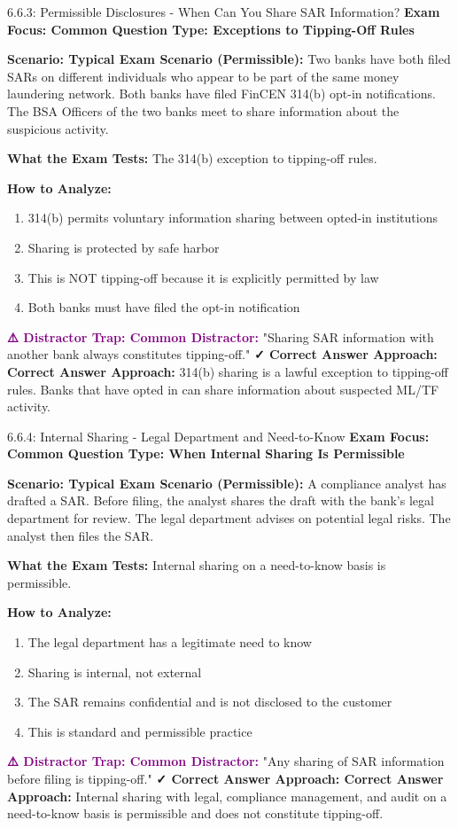 \documentclass[11pt,a4paper]{beamer}
\newcommand{\examfocus}[1]{\textcolor{orange!80!black}{\textbf{Exam Focus: #1}}}
\newcommand{\trap}[1]{\textcolor{purple}{\textbf{⚠️ Distractor Trap: #1}}}
\newcommand{\correct}[1]{\textcolor{green!50!black}{\textbf{✓ Correct Answer Approach: #1}}}
\newcommand{\scenario}[1]{\textcolor{blue!70!black}{\textbf{Scenario: #1}}}
\begin{document}
	\begin{frame}{6.6.3: Permissible Disclosures - When Can You Share SAR Information?}
		\examfocus{Common Question Type: Exceptions to Tipping-Off Rules}
		
		\scenario{Typical Exam Scenario (Permissible):}
		Two banks have both filed SARs on different individuals who appear to be part of the same money laundering network. Both banks have filed FinCEN 314(b) opt-in notifications. The BSA Officers of the two banks meet to share information about the suspicious activity.
		
		\textbf{What the Exam Tests:} The 314(b) exception to tipping-off rules.
		
		\textbf{How to Analyze:}
		\begin{enumerate}
			\item 314(b) permits voluntary information sharing between opted-in institutions
			\item Sharing is protected by safe harbor
			\item This is NOT tipping-off because it is explicitly permitted by law
			\item Both banks must have filed the opt-in notification
		\end{enumerate}
		
		\trap{Common Distractor:} "Sharing SAR information with another bank always constitutes tipping-off."
		\correct{Correct Answer Approach:} 314(b) sharing is a lawful exception to tipping-off rules. Banks that have opted in can share information about suspected ML/TF activity.
	\end{frame}
	
	\begin{frame}{6.6.4: Internal Sharing - Legal Department and Need-to-Know}
		\examfocus{Common Question Type: When Internal Sharing Is Permissible}
		
		\scenario{Typical Exam Scenario (Permissible):}
		A compliance analyst has drafted a SAR. Before filing, the analyst shares the draft with the bank's legal department for review. The legal department advises on potential legal risks. The analyst then files the SAR.
		
		\textbf{What the Exam Tests:} Internal sharing on a need-to-know basis is permissible.
		
		\textbf{How to Analyze:}
		\begin{enumerate}
			\item The legal department has a legitimate need to know
			\item Sharing is internal, not external
			\item The SAR remains confidential and is not disclosed to the customer
			\item This is standard and permissible practice
		\end{enumerate}
		
		\trap{Common Distractor:} "Any sharing of SAR information before filing is tipping-off."
		\correct{Correct Answer Approach:} Internal sharing with legal, compliance management, and audit on a need-to-know basis is permissible and does not constitute tipping-off.
	\end{frame}
	
\end{document}
